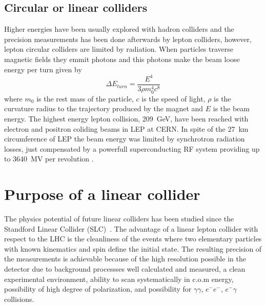 \subsection{Circular or linear colliders}
Higher energies have been usually explored with hadron colliders and the precision measurements has been done afterwards by lepton colliders, however, lepton circular colliders are limited by radiation. When particles traverse magnetic fields they emmit photons and this photons make the beam loose energy per turn given by
\begin{equation}
 \Delta E_{turn}=\frac{E^4}{3\rho m_0^4c^8}
\end{equation}
where $m_0$ is the rest mass of the particle, $c$ is the speed of light, $\rho$ is the curvature radius to the trajectory produced by the magnet and $E$ is the beam energy. The highest energy lepton collision, 209~GeV, have been reached with electron and positron coliding beams in LEP at CERN.  In spite of the 27~km circumference of LEP the beam energy was limited by synchrotron radiation losses, just compensated by a powerfull superconducting RF system providing up to 3640~MV per revolution \cite{Assmann:549223}.\par
\section{Purpose of a linear collider}
The physics potential of future linear colliders has been studied since the Standford Linear Collider (SLC)~\cite{Feldman88,SLC91}. The advantage of a linear lepton collider with respect to the LHC is the cleanliness of the events where two elementary particles with known kinematics and spin define the initial state. The resulting precision of the measurements is achievable because of the high resolution possible in the detector due to background processses well calculated and measured, a clean experimental environment, ability to scan systematically in c.o.m energy, possibility of high degree of polarization, and possibility for $\gamma\gamma$, $e^-e^-$, $e^-\gamma$ collisions.\par
